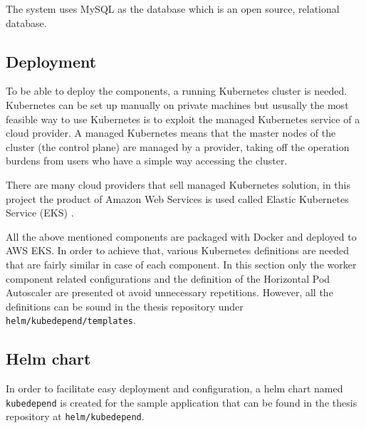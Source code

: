 The system uses MySQL \cite{MySQL} as the database which is an open source, relational database.

\subsection{Deployment}


To be able to deploy the components, a running Kubernetes cluster is needed. Kubernetes can be set up manually on private machines but ususally the most feasible way to use Kubernetes is to exploit the managed Kubernetes service of a cloud provider. A managed Kubernetes means that the master nodes of the cluster (the control plane) are managed by a provider, taking off the operation burdens from users who have a simple way accessing the cluster.

There are many cloud providers that sell managed Kubernetes solution, in this project the product of Amazon Web Services is used called Elastic Kubernetes Service (EKS) \cite{EKS}.

All the above mentioned components are packaged with Docker and deployed to AWS EKS. In order to achieve that, various Kubernetes definitions are needed that are fairly similar in case of each component. In this section only the worker component related configurations and the definition of the Horizontal Pod Autoscaler are presented ot avoid unnecessary repetitions. However, all the definitions can be sound in the thesis repository \cite{ThesisRepo} under \texttt{helm/kubedepend/templates}.

\subsection{Helm chart}

In order to facilitate easy deployment and configuration, a helm chart named \texttt{kubedepend} is created for the sample application that can be found in the thesis repository \cite{ThesisRepo} at \texttt{helm/kubedepend}.

